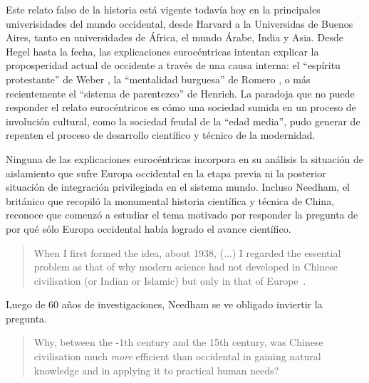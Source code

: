 \documentclass[a4paper,10pt]{book}
\theoremstyle{definition}
\begin{document}

Este relato falso de la historia está vigente todavía hoy en la principales univerisidades del mundo occidental, desde Harvard a la Universidas de Buenos Aires, tanto en universidades de África, el mundo Árabe, India y Asia.
Desde Hegel hasta la fecha, las explicaciones eurocéntricas intentan explicar la proposperidad actual de occidente a través de una causa interna: el ``espíritu protestante'' de Weber \cite{weber}, la ``mentalidad burguesa'' de Romero \cite{romero}, o más recientemente el ``sistema de parentezco''\cite{henrich} de Henrich.
La paradoja que no puede responder el relato eurocéntricos es cómo una sociedad sumida en un proceso de involución cultural, como la sociedad feudal de la ``edad media'', pudo generar de repenten el proceso de desarrollo científico y técnico de la modernidad.


Ninguna de las explicaciones eurocéntricas incorpora en su análisis la situación de aislamiento que sufre Europa occidental en la etapa previa ni la posterior situación de integración privilegiada en el sistema mundo.
Incluso Needham, el británico que recopiló la monumental historia científica y técnica de China, reconoce que comenzó a estudiar el tema motivado por responder la pregunta de por qué sólo Europa occidental había logrado el avance científico.
\begin{quotation}
When I first formed the idea, about 1938, (...) I regarded the essential problem as that of why modern science had not developed in Chinese civilisation (or Indian or Islamic) but only in that of Europe~\cite{needham2004-generalConclusionsAndReflections}.%
\end{quotation}
Luego de 60 años de investigaciones, Needham se ve obligado inviertir la pregunta.
\begin{quotation}
Why, between the -1th century and the 15th century, was Chinese civilisation much \emph{more} efficient than occidental in gaining natural knowledge and in applying it to practical human needs?~\cite{needham2004-generalConclusionsAndReflections}
\end{quotation}
\end{document}
